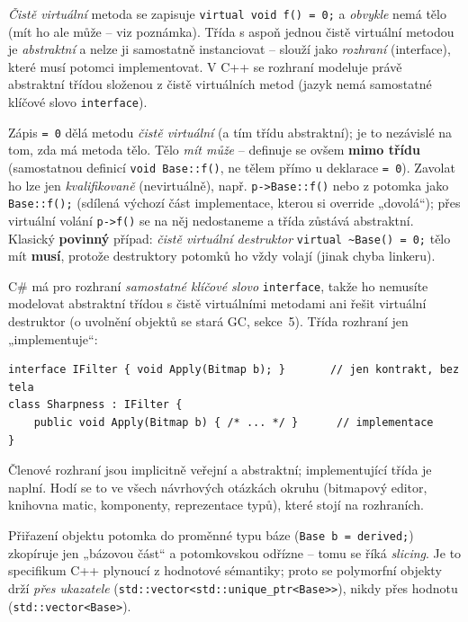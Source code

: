 \documentclass[11pt,a4paper]{article}
\newcommand{\cd}{\lstinline[style=cpp]}
\begin{document}
\begin{definice}
\emph{Čistě virtuální} metoda se zapisuje \cd{virtual void f() = 0;} a \emph{obvykle} nemá tělo (mít ho ale může -- viz poznámka). Třída s aspoň jednou čistě virtuální metodou je \emph{abstraktní} a nelze ji samostatně instanciovat -- slouží jako \emph{rozhraní} (interface), které musí potomci implementovat. V C++ se rozhraní modeluje právě abstraktní třídou složenou z čistě virtuálních metod (jazyk nemá samostatné klíčové slovo \texttt{interface}).
\end{definice}

\begin{poznamka}
Zápis \cd{= 0} dělá metodu \emph{čistě virtuální} (a tím třídu abstraktní); je to nezávislé na tom, zda má metoda tělo. Tělo \emph{mít může} -- definuje se ovšem \textbf{mimo třídu} (samostatnou definicí \cd{void Base::f()}, ne tělem přímo u deklarace \cd{= 0}). Zavolat ho lze jen \emph{kvalifikovaně} (nevirtuálně), např. \cd{p->Base::f()} nebo z potomka jako \cd{Base::f();} (sdílená výchozí část implementace, kterou si override „dovolá``); přes virtuální volání \cd{p->f()} se na něj nedostaneme a třída zůstává abstraktní. Klasický \textbf{povinný} případ: \emph{čistě virtuální destruktor} \cd{virtual ~Base() = 0;} tělo mít \textbf{musí}, protože destruktory potomků ho vždy volají (jinak chyba linkeru).
\end{poznamka}

\begin{csalt}[rozhraní]
C\# má pro rozhraní \emph{samostatné klíčové slovo} \cd{interface}, takže ho nemusíte modelovat abstraktní třídou s čistě virtuálními metodami ani řešit virtuální destruktor (o uvolnění objektů se stará GC, sekce~5). Třída rozhraní jen „implementuje``:
\begin{lstlisting}[style=cs]
interface IFilter { void Apply(Bitmap b); }       // jen kontrakt, bez tela
class Sharpness : IFilter {
    public void Apply(Bitmap b) { /* ... */ }      // implementace
}
\end{lstlisting}
Členové rozhraní jsou implicitně veřejní a abstraktní; implementující třída je naplní. Hodí se to ve všech návrhových otázkách okruhu (bitmapový editor, knihovna matic, komponenty, reprezentace typů), které stojí na rozhraních.
\end{csalt}

\begin{poznamka}[Slicing]
Přiřazení objektu potomka do proměnné typu báze (\cd{Base b = derived;}) zkopíruje jen „bázovou část`` a potomkovskou odřízne -- tomu se říká \emph{slicing}. Je to specifikum C++ plynoucí z hodnotové sémantiky; proto se polymorfní objekty drží \emph{přes ukazatele} (\cd{std::vector<std::unique_ptr<Base>>}), nikdy přes hodnotu (\cd{std::vector<Base>}).
\end{poznamka}
\end{document}
